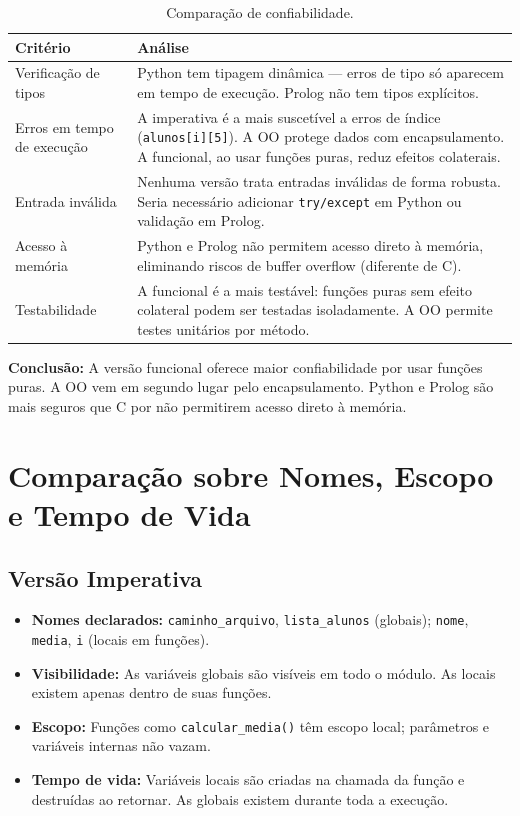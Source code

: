 \documentclass[12pt, a4paper]{article}
\begin{document}
\begin{table}[h]
\centering
\begin{tabularx}{\textwidth}{lX}
\toprule
\textbf{Critério} & \textbf{Análise} \\
\midrule
Verificação de tipos & Python tem tipagem dinâmica --- erros de tipo só aparecem em tempo de execução. Prolog não tem tipos explícitos. \\
\addlinespace
Erros em tempo de execução & A imperativa é a mais suscetível a erros de índice (\texttt{alunos[i][5]}). A OO protege dados com encapsulamento. A funcional, ao usar funções puras, reduz efeitos colaterais. \\
\addlinespace
Entrada inválida & Nenhuma versão trata entradas inválidas de forma robusta. Seria necessário adicionar \texttt{try/except} em Python ou validação em Prolog. \\
\addlinespace
Acesso à memória & Python e Prolog não permitem acesso direto à memória, eliminando riscos de buffer overflow (diferente de C). \\
\addlinespace
Testabilidade & A funcional é a mais testável: funções puras sem efeito colateral podem ser testadas isoladamente. A OO permite testes unitários por método. \\
\bottomrule
\end{tabularx}
\caption{Comparação de confiabilidade.}
\end{table}

\textbf{Conclusão:} A versão funcional oferece maior confiabilidade por usar funções puras. A OO vem em segundo lugar pelo encapsulamento. Python e Prolog são mais seguros que C por não permitirem acesso direto à memória.

\section{Comparação sobre Nomes, Escopo e Tempo de Vida}

\subsection{Versão Imperativa}

\begin{itemize}
    \item \textbf{Nomes declarados:} \texttt{caminho\_arquivo}, \texttt{lista\_alunos} (globais); \texttt{nome}, \texttt{media}, \texttt{i} (locais em funções).
    \item \textbf{Visibilidade:} As variáveis globais são visíveis em todo o módulo. As locais existem apenas dentro de suas funções.
    \item \textbf{Escopo:} Funções como \texttt{calcular\_media()} têm escopo local; parâmetros e variáveis internas não vazam.
    \item \textbf{Tempo de vida:} Variáveis locais são criadas na chamada da função e destruídas ao retornar. As globais existem durante toda a execução.
\end{itemize}
\end{document}

